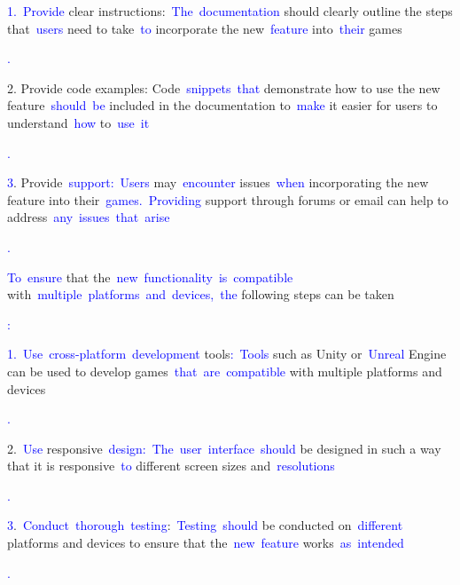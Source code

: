\documentclass{article}
\begin{document}
\begin{tcolorbox}[colframe=black,colback=white]
{}\textcolor{blue}{1}\textcolor{blue}{.}\textcolor{blue}{~Provide} clear instructions:\textcolor{blue}{~The}\textcolor{blue}{~documentation} should clearly outline the steps that\textcolor{blue}{~users} need to take\textcolor{blue}{~to} incorporate the new\textcolor{blue}{~feature} into\textcolor{blue}{~their} games\textcolor{blue}{.

}2. Provide code examples: Code\textcolor{blue}{~snippets}\textcolor{blue}{~that} demonstrate how to use the new feature\textcolor{blue}{~should}\textcolor{blue}{~be} included in the documentation to\textcolor{blue}{~make} it easier for users to understand\textcolor{blue}{~how} to\textcolor{blue}{~use}\textcolor{blue}{~it}\textcolor{blue}{.

}\textcolor{blue}{3}. Provide\textcolor{blue}{~support}\textcolor{blue}{:}\textcolor{blue}{~Users} may\textcolor{blue}{~encounter} issues\textcolor{blue}{~when} incorporating the new feature into their\textcolor{blue}{~games}\textcolor{blue}{.}\textcolor{blue}{~Providing} support through forums or email can help to address\textcolor{blue}{~any}\textcolor{blue}{~issues}\textcolor{blue}{~that}\textcolor{blue}{~arise}\textcolor{blue}{.

}\textcolor{blue}{To}\textcolor{blue}{~ensure} that the\textcolor{blue}{~new}\textcolor{blue}{~functionality}\textcolor{blue}{~is}\textcolor{blue}{~compatible} with\textcolor{blue}{~multiple}\textcolor{blue}{~platforms}\textcolor{blue}{~and}\textcolor{blue}{~devices}\textcolor{blue}{,}\textcolor{blue}{~the} following steps can be taken\textcolor{blue}{:

}\textcolor{blue}{1}\textcolor{blue}{.}\textcolor{blue}{~Use}\textcolor{blue}{~cross}\textcolor{blue}{-platform}\textcolor{blue}{~development} tools\textcolor{blue}{:}\textcolor{blue}{~Tools} such as Unity or\textcolor{blue}{~Unreal} Engine can be used to develop games\textcolor{blue}{~that}\textcolor{blue}{~are}\textcolor{blue}{~compatible} with multiple platforms and devices\textcolor{blue}{.

}2.\textcolor{blue}{~Use} responsive\textcolor{blue}{~design}\textcolor{blue}{:}\textcolor{blue}{~The}\textcolor{blue}{~user}\textcolor{blue}{~interface}\textcolor{blue}{~should} be designed in such a way that it is responsive\textcolor{blue}{~to} different screen sizes and\textcolor{blue}{~resolutions}\textcolor{blue}{.

}\textcolor{blue}{3}.\textcolor{blue}{~Conduct}\textcolor{blue}{~thorough}\textcolor{blue}{~testing}:\textcolor{blue}{~Testing}\textcolor{blue}{~should} be conducted on\textcolor{blue}{~different} platforms and devices to ensure that the\textcolor{blue}{~new}\textcolor{blue}{~feature} works\textcolor{blue}{~as}\textcolor{blue}{~intended}\textcolor{blue}{.

}
\end{tcolorbox}
\end{document}
